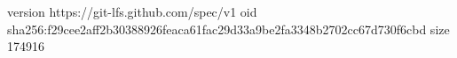 version https://git-lfs.github.com/spec/v1
oid sha256:f29cee2aff2b30388926feaca61fac29d33a9be2fa3348b2702cc67d730f6cbd
size 174916
